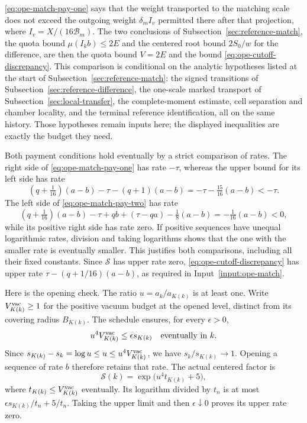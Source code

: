 \eqref{eq:ope-match-pay-one} says that the weight transported to the
matching scale does not exceed the outgoing weight $\delta_mI_v$
permitted there after that projection, where $I_v=X/(16\mathcal B_m)$.
The two conclusions of Subsection~\ref{sec:reference-match}, the quota
bound $\mu(I_kb)\le2E$ and the centered root bound $2S_0/w$ for the
difference, are then the quota bound $V=2E$ and the bound
\eqref{eq:ope-cutoff-discrepancy}. This comparison is conditional on
the analytic hypotheses listed at the start of
Subsection~\ref{sec:reference-match}: the signed transitions of
Subsection~\ref{sec:reference-difference}, the one-scale marked transport
of Subsection~\ref{sec:local-transfer}, the complete-moment estimate, cell
separation and chamber locality, and the terminal reference
identification, all on the same history. Those hypotheses remain inputs
here; the displayed inequalities are exactly the budget they need.

Both payment conditions hold eventually by a strict comparison of
rates. The right side of \eqref{eq:ope-match-pay-one} has rate
$-\tau$, whereas the upper bound for its left side has rate
\[
 (q+\tfrac1{16})(a-b)-\tau-(q+1)(a-b)
       =-\tau-\tfrac{15}{16}(a-b)<-\tau.
\]
The left side of \eqref{eq:ope-match-pay-two} has rate
\[
 (q+\tfrac1{16})(a-b)-\tau+qb+(\tau-qa)
       -\tfrac18(a-b)=-\tfrac1{16}(a-b)<0,
\]
while its positive right side has rate zero. If positive sequences
have unequal logarithmic rates, division and taking logarithms shows
that the one with the smaller rate is eventually smaller. This
justifies both comparisons, including all their fixed constants.
Since $\mathcal S$ has upper rate zero, \eqref{eq:ope-cutoff-discrepancy}
has upper rate $\tau-(q+1/16)(a-b)$, as required in
Input~\ref{input:ope-match}.

Here is the opening check. The ratio $u=a_k/a_{K(k)}$ is at least one. Write
$V^{\rm vac}_{K(k)}\geq1$ for the positive vacuum budget at the opened
level, distinct from its covering radius $B_{K(k)}$. The schedule ensures, for every $\epsilon>0$,
\[
 u^4 V^{\rm vac}_{K(k)}\leq\epsilon s_{K(k)}\quad\hbox{eventually in }k.
\]
Since $s_{K(k)}-s_k=\log u\leq u\leq u^4V^{\rm vac}_{K(k)}$,
we have $s_k/s_{K(k)}\to1$. Opening a sequence of rate $b$
therefore retains that rate. The actual centered factor is
\[
 \mathcal S(k)=\exp\bigl(u^4 t_{K(k)}+5\bigr),
\]
where $t_{K(k)}\leq V^{\rm vac}_{K(k)}$ eventually. Its logarithm divided
by $t_n$ is at most $\epsilon s_{K(k)}/t_n+5/t_n$.
Taking the upper limit and then $\epsilon\downarrow0$ proves its
upper rate zero.

